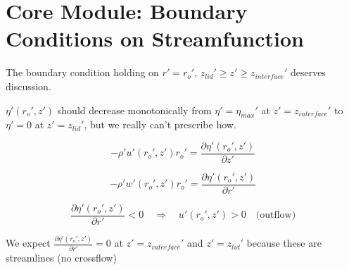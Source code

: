 \documentclass[preprint, prX]{revtex4}
\newcommand{\pd}[2]{\frac{\partial#1}{\partial#2}}
\begin{document}
\section{Core Module: Boundary Conditions on Streamfunction}

\begin{figure}[h!]
	\centering
	\def\svgwidth{0.7\columnwidth}
	
\end{figure}

The boundary condition holding on $r'=r_o'$, $z_{lid}'\geq z' \geq z_{interface}'$ deserves discussion.

$\eta'(r_o',z')$ should decrease monotonically from $\eta' = \eta_{max}'$ at $z'=z_{interface}'$ to $\eta'=0$ at $z'=z_{lid}'$, but we really can't prescribe how.

\begin{equation}
-\rho' u'(r_o',z')r_o' = \pd{\eta'(r_o',z')}{z'}
\end{equation}

\begin{equation}
-\rho' w'(r_o',z')r_o' = \pd{\eta'(r_o',z')}{r'}
\end{equation}


\begin{equation}
\pd{\eta'(r_o',z')}{r'} <0 \quad \Rightarrow \quad u'(r_o',z') > 0 \quad \text{(outflow)}
\end{equation}

We expect $\pd{\eta'(r_o',z')}{r'} =0$ at $z'=z_{interface}'$ and $z'=z_{lid}'$ because these are streamlines (no crossflow)
\end{document}
